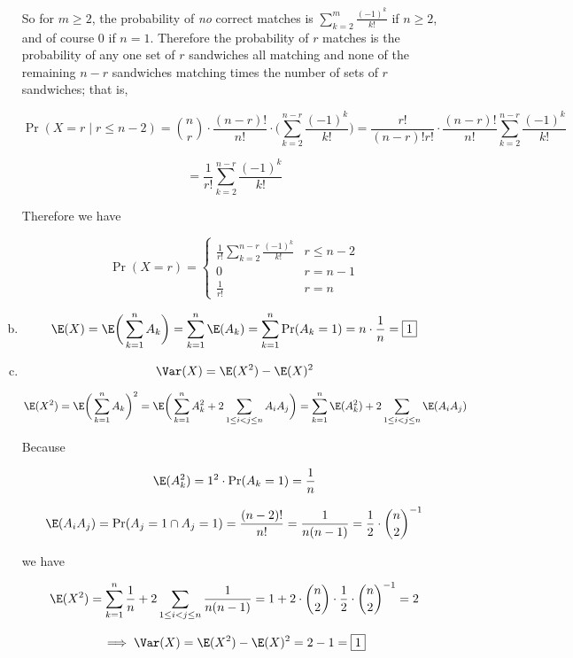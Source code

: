 \begin{enumerate}[(a)]

So for \(m \geq 2\), the probability of \textit{no} correct matches is \(\sum_{k=2}^m \frac{(-1)^{k}}{k!}\) if \(n \geq 2\), and of course \(0\) if \(n = 1\). Therefore the probability of \(r\) matches is the probability of any one set of \(r\) sandwiches all matching and none of the remaining \(n-r\) sandwiches matching times the number of sets of \(r\) sandwiches; that is,

\[
\Pr(X=r \mid r \leq n -2) = \binom{n}{r}  \cdot \frac{(n-r)!}{n!} \cdot \bigg( \sum_{k=2}^{n-r} \frac{(-1)^{k}}{k!} \bigg) = \frac{r!}{(n-r)!r!} \cdot \frac{(n-r)!}{n!} \sum_{k=2}^{n-r} \frac{(-1)^{k}}{k!}  
\]

\[
= \frac{1}{r!} \sum_{k=2}^{n-r} \frac{(-1)^{k}}{k!} 
\]

Therefore we have

\[
\boxed{
\Pr(X=r) = \begin{cases}
\frac{1}{r!} \sum_{k=2}^{n-r} \frac{(-1)^{k}}{k!}  & r \leq n-2 \\
0 & r = n -1 \\
\frac{1}{r!} & r=n
\end{cases}
}
\]


\item 

\[
\E(X) = \E \bigg( \sum_{k=1}^n A_k \bigg) = \sum_{k=1}^n \E(A_k) = \sum_{k=1}^n \Pr(A_k = 1) = n \cdot \frac{1}{n} = \boxed{1}
\]

\item 

\[
\Var(X) = \E(X^2) - \E(X)^2 
\]

\[
\E(X^2) = \E \bigg(\sum_{k=1}^n A_k \bigg)^2 = \E \bigg(\sum_{k=1}^n A_k^2 + 2 \sum_{1 \leq i < j \leq n} A_i A_j\bigg) = \sum_{k=1}^n \E(A_k^2 ) + 2 \sum_{1 \leq i < j \leq n}  \E(A_i A_j )
\]

Because

\[
\E(A_k^2) = 1^2 \cdot \Pr(A_k = 1) = \frac{1}{n}
\]

\[
\E(A_i A_j) = \Pr(A_j = 1 \cap A_j = 1) = \frac{(n-2)!}{n!}  =  \frac{1}{n(n-1)} = \frac{1}{2} \cdot \binom{n}{2}^{-1}
\]

we have

\[
\E(X^2) = \sum_{k=1}^n \frac{1}{n} + 2 \sum_{1 \leq i < j \leq n}  \frac{1}{n(n-1)} = 1 + 2 \cdot \binom{n}{2} \cdot \frac{1}{2} \cdot \binom{n}{2}^{-1} = 2
\]

\[
\implies \Var(X) = \E(X^2) - \E(X)^2 = 2 - 1 = \boxed{1}
\]



\end{enumerate}

